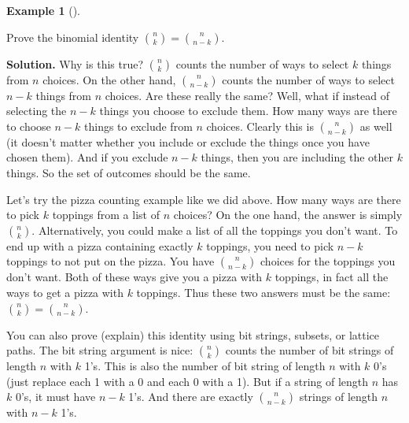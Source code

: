 \documentclass[10pt,]{book}
\theoremstyle{plain}
\theoremstyle{definition}
\newtheorem{example}[theorem]{Example}
\theoremstyle{definition}
\theoremstyle{definition}
\numberwithin{equation}{section}
\begin{document}
\begin{example}[]\label{ex_symmetry-formula}

          Prove the binomial identity \({n \choose k} = {n \choose n-k}\).
\par\medskip\noindent%
\textbf{Solution.}\quad 
          Why is this true? \({n \choose k}\) counts the number of ways to select \(k\) things from \(n\) choices. On the other hand, \({n \choose n-k}\) counts the number of ways to select \(n-k\) things from \(n\) choices. Are these really the same? Well, what if instead of selecting the \(n-k\) things you choose to exclude them. How many ways are there to choose \(n-k\) things to exclude from \(n\) choices. Clearly this is \({n \choose n-k}\) as well (it doesn't matter whether you include or exclude the things once you have chosen them). And if you exclude \(n-k\) things, then you are including the other \(k\) things. So the set of outcomes should be the same.
\par

          Let's try the pizza counting example like we did above. How many ways are there to pick \(k\) toppings from a list of \(n\) choices? On the one hand, the answer is simply \({n \choose k}\). Alternatively, you could make a list of all the toppings you don't want. To end up with a pizza containing exactly \(k\) toppings, you need to pick \(n-k\) toppings to not put on the pizza. You have \({n \choose n-k}\) choices for the toppings you don't want. Both of these ways give you a pizza with \(k\) toppings, in fact all the ways to get a pizza with \(k\) toppings. Thus these two answers must be the same: \({n \choose k} = {n \choose n-k}\).
\par

          You can also prove (explain) this identity using bit strings, subsets, or lattice paths. The bit string argument is nice: \({n \choose k}\) counts the number of bit strings of length \(n\) with \(k\) 1's. This is also the number of bit string of length \(n\) with \(k\) 0's (just replace each 1 with a 0 and each 0 with a 1). But if a string of length \(n\) has \(k\) 0's, it must have \(n-k\) 1's. And there are exactly \({n\choose n-k}\) strings of length \(n\) with \(n-k\) 1's.
\end{example}
\end{document}
